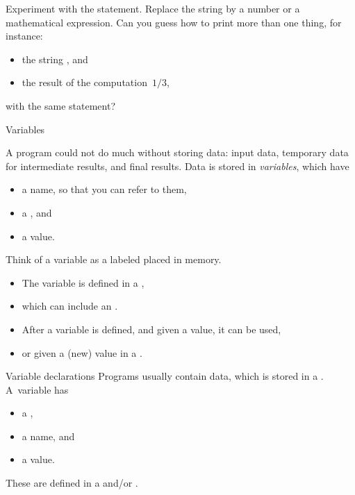 \begin{exercise}
  \label{ex:cout-what}
  Experiment with the  statement. Replace the string by a
  number or a mathematical expression. Can you guess how to print more
  than one thing, for instance:
  \begin{itemize}
  \item the string , and
  \item the result of the computation~$1/3$,     
  \end{itemize}
  with the same  statement?
\end{exercise}

 {Variables}
\label{sec:variables}

A program could not do much without storing data: input data,
temporary data for intermediate results, and final results.
Data is stored in \emph{variables},  which have
\begin{itemize}
\item a name, so that you can refer to them,
\item a , and
\item a value.
\end{itemize}
Think of a variable as a labeled placed in memory.
\begin{itemize}
\item The variable is defined in a
  ,
\item which can include an .
\item After a variable is defined, and given a value, it can be used,
\item or given a (new) value in a .
\end{itemize}

\begin{slide}{Variable declarations}
  \label{sl:declaration}
  Programs usually contain data, which is stored in a
  . A~variable has
  \begin{itemize}
  \item a ,
  \item a name, and
  \item a value.
  \end{itemize}
  These are defined in a  and/or
  .
\end{slide}

